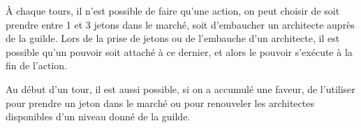 À chaque tours, il n'est possible de faire qu'une action, on peut choisir de soit prendre entre 1 et 3 jetons dans le marché, soit d'embaucher un architecte auprès de la guilde. Lors de la prise de jetons ou de l'embauche d'un architecte, il est possible qu'un pouvoir soit attaché à ce dernier, et alors le pouvoir s'exécute à la fin de l'action.

Au début d'un tour, il est aussi possible, si on a accumulé une faveur, de l'utiliser pour prendre un jeton dans le marché ou pour renouveler les architectes disponibles d'un niveau donné de la guilde.


